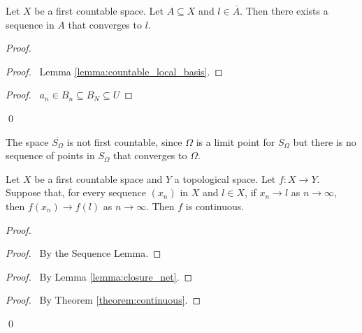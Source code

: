 \begin{lemma}
    Let $X$ be a first countable space. Let $A \subseteq X$ and $l \in \overline{A}$.
    Then there exists a sequence in $A$ that converges to $l$.
\end{lemma}

\begin{proof}
    \pf
    \begin{proof}
        \pf\ Lemma \ref{lemma:countable_local_basis}.
    \end{proof}
    \begin{proof}
        \pf\ $a_n \in B_n \subseteq B_N \subseteq U$
    \end{proof}
    \qed
\end{proof}

\begin{example}
    \label{example:S_Omega_bar_not_first_countable}
    The space $\overline{S_\Omega}$ is not first countable, since $\Omega$
    is a limit point for $S_\Omega$ but there is no sequence of points in
    $S_\Omega$ that converges to $\Omega$.
\end{example}

\begin{theorem}[CC]
    Let $X$ be a first countable space and $Y$ a topological space. Let $f : X \rightarrow Y$. Suppose that, for every sequence $(x_n)$ in $X$ and $l \in X$, if $x_n \rightarrow l$
    as $n \rightarrow \infty$, then $f(x_n) \rightarrow f(l)$ as $n \rightarrow \infty$. Then $f$ is continuous.
\end{theorem}

\begin{proof}
    \pf
    \begin{proof}
        \pf\ By the Sequence Lemma.
    \end{proof}
    \begin{proof}
        \pf\ By Lemma \ref{lemma:closure_net}.
    \end{proof}
    \qedstep
    \begin{proof}
        \pf\ By Theorem \ref{theorem:continuous}.
    \end{proof}
    \qed
\end{proof}

